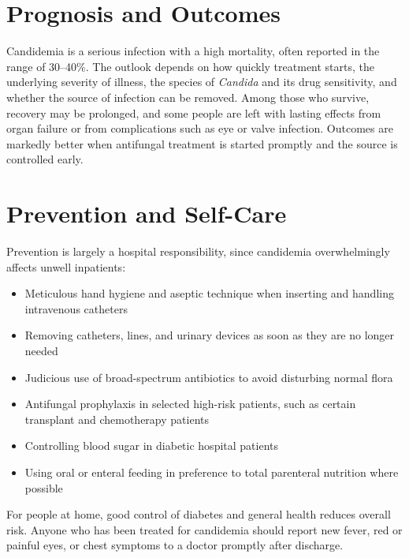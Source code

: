 \section*{Prognosis and Outcomes}
Candidemia is a serious infection with a high mortality, often reported in the range of 30--40\%. The outlook depends on how quickly treatment starts, the underlying severity of illness, the species of \textit{Candida} and its drug sensitivity, and whether the source of infection can be removed. Among those who survive, recovery may be prolonged, and some people are left with lasting effects from organ failure or from complications such as eye or valve infection. Outcomes are markedly better when antifungal treatment is started promptly and the source is controlled early.

\section*{Prevention and Self-Care}
Prevention is largely a hospital responsibility, since candidemia overwhelmingly affects unwell inpatients:
\begin{itemize}
    \item Meticulous hand hygiene and aseptic technique when inserting and handling intravenous catheters
    \item Removing catheters, lines, and urinary devices as soon as they are no longer needed
    \item Judicious use of broad-spectrum antibiotics to avoid disturbing normal flora
    \item Antifungal prophylaxis in selected high-risk patients, such as certain transplant and chemotherapy patients
    \item Controlling blood sugar in diabetic hospital patients
    \item Using oral or enteral feeding in preference to total parenteral nutrition where possible
\end{itemize}
For people at home, good control of diabetes and general health reduces overall risk. Anyone who has been treated for candidemia should report new fever, red or painful eyes, or chest symptoms to a doctor promptly after discharge.


